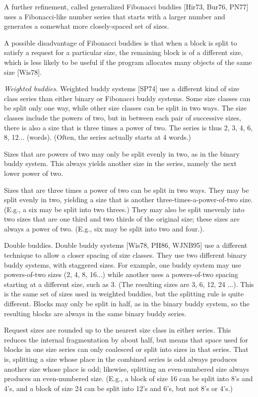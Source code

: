 \documentclass[a4paper,12pt,notitlepage,twoside,openright]{article}
\begin{document}
A further refinement, called generalized Fibonacci buddies [Hir73, Bur76,
PN77] uses a Fibonacci-like number series that starts with a larger number
and generates a somewhat more closely-spaced set of sizes.

A possible disadvantage of Fibonacci buddies is that when a block is split to
satisfy a request for a particular size, the remaining block is of a different size,
which is less likely to be useful if the program allocates many objects of the same
size [Wis78].

\emph{Weighted buddies}. Weighted buddy systems [SP74] use a different kind of size
class series than either binary or Fibonacci buddy systems. Some size classes can
be split only one way, while other size classes can be split in two ways. The size
classes include the powers of two, but in between each pair of successive sizes,
there is also a size that is three times a power of two. The series is thus 2, 3, 4,
6, 8, 12... (words). (Often, the series actually starts at 4 words.)

Sizes that are powers of two may only be split evenly in two, as in the binary
buddy system. This always yields another size in the series, namely the next
lower power of two.

Sizes that are three times a power of two can be split in two ways. They may
be split evenly in two, yielding a size that is another three-times-a-power-of-two
size. (E.g., a six may be split into two threes.) They may also be split unevenly
into two sizes that are one third and two thirds of the original size; these sizes
are always a power of two. (E.g., six may be split into two and four.).

Double buddies. Double buddy systems [Wis78, PH86, WJNB95] use a different
technique to allow a closer spacing of size classes. They use two different binary
buddy systems, with staggered sizes. For example, one buddy system may use
powers-of-two sizes (2, 4, 8, 16...) while another uses a powers-of-two spacing
starting at a different size, such as 3. (The resulting sizes are 3, 6, 12, 24 ...).
This is the same set of sizes used in weighted buddies, but the splitting rule is
quite different. Blocks may only be split in half, as in the binary buddy system,
so the resulting blocks are always in the same binary buddy series.

Request sizes are rounded up to the nearest size class in either series. This
reduces the internal fragmentation by about half, but means that space used for
blocks in one size series can only coalesced or split into sizes in that series. That
is, splitting a size whose place in the combined series is odd always produces
another size whose place is odd; likewise, splitting an even-numbered size always
produces an even-numbered size. (E.g., a block of size 16 can be split into 8's
and 4's, and a block of size 24 can be split into 12's and 6's, but not 8's or 4's.)
\end{document}
